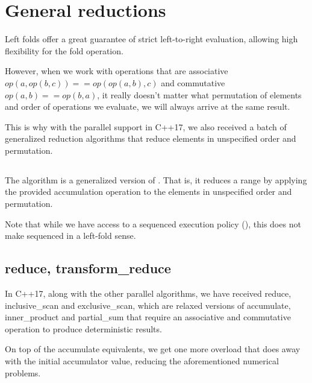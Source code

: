 \section{General reductions}

Left folds offer a great guarantee of strict left-to-right evaluation, allowing high flexibility for the fold operation.

However, when we work with operations that are associative $op(a, op(b,c)) == op(op(a,b),c)$ and commutative $op(a,b) == op(b,a)$, it really doesn’t matter what permutation of elements and order of operations we evaluate, we will always arrive at the same result.

This is why with the parallel support in C++17, we also received a batch of generalized reduction algorithms that reduce elements in unspecified order and permutation.

\subsection{\texorpdfstring{}{\texttt{std::reduce}}}

The  algorithm is a generalized version of . That is, it reduces a range by applying the provided accumulation operation to the elements in unspecified order and permutation.


Note that while we have access to a sequenced execution policy (), this does not make  sequenced in a left-fold sense.



\subsection{reduce, transform\_reduce}

In C++17, along with the other parallel algorithms, we have received reduce, inclusive\_scan and exclusive\_scan, which are relaxed versions of accumulate, inner\_product and partial\_sum that require an associative and commutative operation to produce deterministic results.


On top of the accumulate equivalents, we get one more overload that does away with the initial accumulator value, reducing the aforementioned numerical problems.

